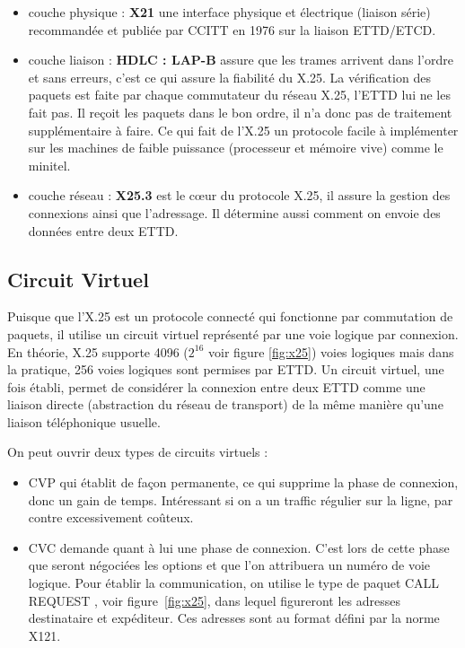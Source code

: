 \documentclass[12pt]{report}
\begin{document}
\begin{itemize}
\item couche physique : \textbf{X21} une interface physique et électrique (liaison série) recommandée et publiée par CCITT en 1976 sur la liaison ETTD/ETCD\cite{wikix21}.
\item couche liaison : \textbf{HDLC : LAP-B} assure que les trames arrivent dans l'ordre et sans erreurs, c'est ce qui assure la fiabilité du X.25. La vérification des paquets est faite
par chaque commutateur du réseau X.25, l'ETTD lui ne les fait pas. Il reçoit les paquets dans le bon ordre, il n'a donc pas de traitement supplémentaire à faire. Ce qui fait de l'X.25 un protocole facile
à implémenter sur les machines de faible puissance (processeur et mémoire vive) comme le minitel\cite{wikilapb}.
\item couche réseau : \textbf{X25.3} est le cœur du protocole X.25, il assure la gestion des connexions ainsi que l'adressage\cite{gatoux}. Il détermine aussi comment on envoie des données entre deux ETTD.
\end{itemize}

\subsection{Circuit Virtuel}
Puisque que l'X.25 est un protocole connecté qui fonctionne par commutation de paquets, il utilise un circuit virtuel représenté par une voie logique par connexion. En théorie, X.25 supporte 4096 ($2^{16}$ voir figure \ref{fig:x25}) voies logiques mais dans la pratique, 256 voies logiques sont permises par ETTD.
Un circuit virtuel, une fois établi, permet de considérer la connexion entre deux ETTD comme une liaison directe (abstraction du réseau de transport) de la même manière qu'une liaison téléphonique usuelle\cite{navarro}.

On peut ouvrir deux types de circuits virtuels :
\begin{itemize}
\item \gls{CVP} qui établit de façon permanente, ce qui supprime la phase de connexion, donc un gain de temps. Intéressant si on a un traffic régulier sur la ligne, par contre excessivement coûteux.
\item \gls{CVC} demande quant à lui une phase de connexion. C'est lors de cette phase que seront négociées les options et que l'on attribuera un numéro de voie logique. Pour établir la communication, on utilise le type de paquet \og CALL REQUEST \fg, voir figure~\ref{fig:x25}, dans lequel figureront les adresses destinataire et expéditeur. Ces adresses sont au format défini par la norme X121\cite{navarro}\cite{gateau}.
\end{itemize}
\end{document}
